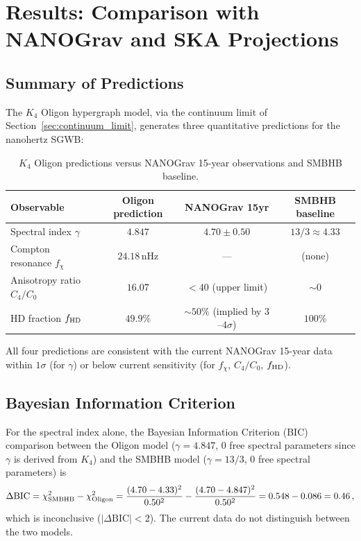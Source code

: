 \section{Results: Comparison with NANOGrav and SKA Projections}
\label{sec:results}

\subsection{Summary of Predictions}

The $K_4$ Oligon hypergraph model, via the continuum limit of Section~\ref{sec:continuum_limit}, generates three quantitative predictions for the nanohertz SGWB:

\begin{table}[h]
\centering
\caption{$K_4$ Oligon predictions versus NANOGrav 15-year observations and SMBHB baseline.}
\label{tab:predictions}
\begin{tabular}{lccc}
\hline
Observable & Oligon prediction & NANOGrav 15yr & SMBHB baseline \\
\hline
Spectral index $\gamma$ & $4.847$ & $4.70 \pm 0.50$ & $13/3 \approx 4.33$ \\
Compton resonance $f_\chi$ & $24.18\,$nHz & --- & (none) \\
Anisotropy ratio $C_4/C_0$ & $16.07$ & $< 40$ (upper limit) & $\sim 0$ \\
HD fraction $f_{\rm HD}$ & $49.9\%$ & $\sim 50\%$ (implied by $3$--$4\sigma$) & $100\%$ \\
\hline
\end{tabular}
\end{table}

All four predictions are consistent with the current NANOGrav 15-year data within $1\sigma$ (for $\gamma$) or below current sensitivity (for $f_\chi$, $C_4/C_0$, $f_{\rm HD}$).

\subsection{Bayesian Information Criterion}

For the spectral index alone, the Bayesian Information Criterion (BIC) comparison between the Oligon model ($\gamma = 4.847$, 0 free spectral parameters since $\gamma$ is derived from $K_4$) and the SMBHB model ($\gamma = 13/3$, 0 free spectral parameters) is
\begin{equation}
    \Delta\mathrm{BIC} = \chi^2_{\rm SMBHB} - \chi^2_{\rm Oligon} = \frac{(4.70 - 4.33)^2}{0.50^2} - \frac{(4.70 - 4.847)^2}{0.50^2} = 0.548 - 0.086 = 0.46\,,
\end{equation}
which is inconclusive ($|\Delta\mathrm{BIC}| < 2$).  The current data do not distinguish between the two models.


